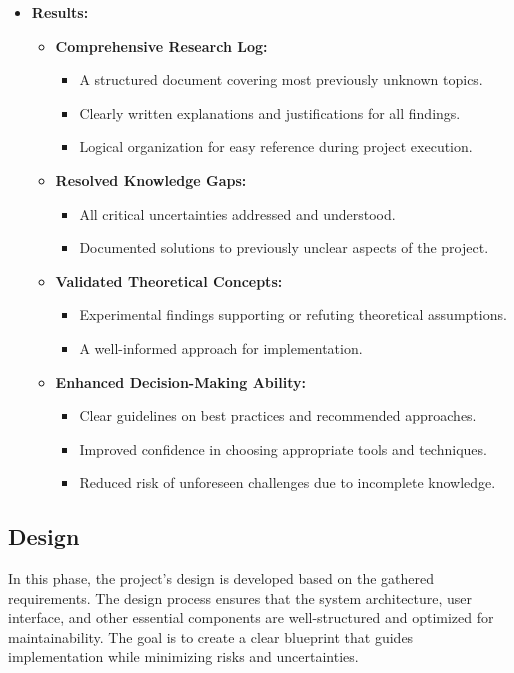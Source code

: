 \documentclass{article}
\begin{document}
\begin{itemize}[leftmargin=*, label={}]
    \item \textbf{Results:}
    \begin{itemize}
        \item \textbf{Comprehensive Research Log:}
        \begin{itemize}
            \item A structured document covering most previously unknown topics.
            \item Clearly written explanations and justifications for all findings.
            \item Logical organization for easy reference during project execution.
        \end{itemize}
        \item \textbf{Resolved Knowledge Gaps:}
        \begin{itemize}
            \item All critical uncertainties addressed and understood.
            \item Documented solutions to previously unclear aspects of the project.
        \end{itemize}
        \item \textbf{Validated Theoretical Concepts:}
        \begin{itemize}
            \item Experimental findings supporting or refuting theoretical assumptions.
            \item A well-informed approach for implementation.
        \end{itemize}
        \item \textbf{Enhanced Decision-Making Ability:}
        \begin{itemize}
            \item Clear guidelines on best practices and recommended approaches.
            \item Improved confidence in choosing appropriate tools and techniques.
            \item Reduced risk of unforeseen challenges due to incomplete knowledge.
        \end{itemize}
    \end{itemize}
\end{itemize}


\subsection{Design}
In this phase, the project's design is developed based on the gathered requirements.
The design process ensures that the system architecture, user interface, and other essential components are well-structured and optimized for maintainability.
The goal is to create a clear blueprint that guides implementation while minimizing risks and uncertainties.
\end{document}
